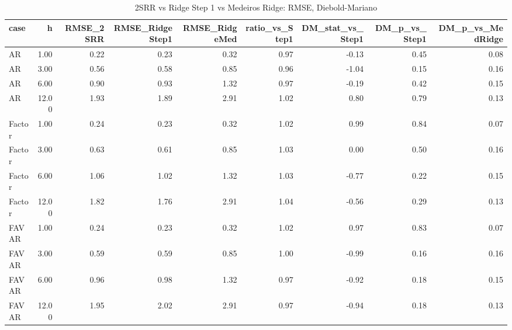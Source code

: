 \begin{table}[ht]
\centering
\begin{tabular}{lrrrrrrrr}
  \hline
case & h & RMSE\_2SRR & RMSE\_RidgeStep1 & RMSE\_RidgeMed & ratio\_vs\_Step1 & DM\_stat\_vs\_Step1 & DM\_p\_vs\_Step1 & DM\_p\_vs\_MedRidge \\ 
  \hline
AR & 1.00 & 0.22 & 0.23 & 0.32 & 0.97 & -0.13 & 0.45 & 0.08 \\ 
  AR & 3.00 & 0.56 & 0.58 & 0.85 & 0.96 & -1.04 & 0.15 & 0.16 \\ 
  AR & 6.00 & 0.90 & 0.93 & 1.32 & 0.97 & -0.19 & 0.42 & 0.15 \\ 
  AR & 12.00 & 1.93 & 1.89 & 2.91 & 1.02 & 0.80 & 0.79 & 0.13 \\ 
  Factor & 1.00 & 0.24 & 0.23 & 0.32 & 1.02 & 0.99 & 0.84 & 0.07 \\ 
  Factor & 3.00 & 0.63 & 0.61 & 0.85 & 1.03 & 0.00 & 0.50 & 0.16 \\ 
  Factor & 6.00 & 1.06 & 1.02 & 1.32 & 1.03 & -0.77 & 0.22 & 0.15 \\ 
  Factor & 12.00 & 1.82 & 1.76 & 2.91 & 1.04 & -0.56 & 0.29 & 0.13 \\ 
  FAVAR & 1.00 & 0.24 & 0.23 & 0.32 & 1.02 & 0.97 & 0.83 & 0.07 \\ 
  FAVAR & 3.00 & 0.59 & 0.59 & 0.85 & 1.00 & -0.99 & 0.16 & 0.16 \\ 
  FAVAR & 6.00 & 0.96 & 0.98 & 1.32 & 0.97 & -0.92 & 0.18 & 0.15 \\ 
  FAVAR & 12.00 & 1.95 & 2.02 & 2.91 & 0.97 & -0.94 & 0.18 & 0.13 \\ 
   \hline
\end{tabular}
\caption{2SRR vs Ridge Step 1 vs Medeiros Ridge: RMSE, Diebold-Mariano} 
\label{tab:2srr_vs_ridge}
\end{table}
